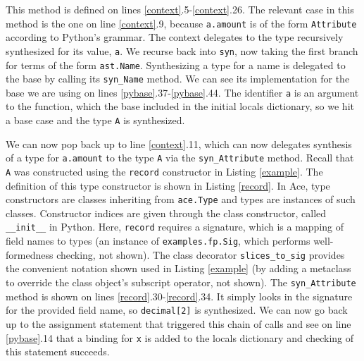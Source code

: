 \documentclass[10pt,preprint]{sigplanconf}
\begin{document}
{%

This method is defined on lines \ref{context}.5-\ref{context}.26. The relevant case in this method is the one on line \ref{context}.9, because \verb|a.amount| is of the form \verb|Attribute| according to Python's grammar. The context delegates to the type recursively synthesized for its value, \verb|a|. We recurse back into \verb|syn|, now taking the first branch for terms of the form \verb|ast.Name|. Synthesizing a type for a name is delegated to the base by calling its \verb|syn_Name| method. We can see its implementation for the base we are using on lines \ref{pybase}.37-\ref{pybase}.44. The identifier \verb|a| is an argument to the function, which the base included in the initial locals dictionary, so we hit a base case and the type \verb|A| is synthesized.

We can now pop back up to line \ref{context}.11, which can now delegates synthesis of a type for \verb|a.amount| to the type \verb|A| via the \verb|syn_Attribute| method. Recall that \verb|A| was constructed using the \verb|record| constructor in Listing \ref{example}. The definition of this type constructor is shown in Listing \ref{record}. In Ace, type constructors are classes inheriting from \verb|ace.Type| and types are instances of such classes. Constructor indices are given through the class constructor, called \verb|__init__| in Python. Here, \verb|record| requires a signature, which is a mapping of field names to types (an instance of \verb|examples.fp.Sig|, which performs well-formedness checking, not shown). The class decorator \verb|slices_to_sig| provides the convenient notation shown used in Listing \ref{example} (by adding a metaclass to override the class object's subscript operator, not shown). The \verb|syn_Attribute| method is shown on lines \ref{record}.30-\ref{record}.34. It simply looks in the signature for the provided field name, so \verb|decimal[2]| is synthesized. We can now go back up to the assignment statement that triggered this chain of calls and see on line \ref{pybase}.14 that a binding for \verb|x| is added to the locals dictionary and checking of this statement succeeds. 

}
\end{document}
